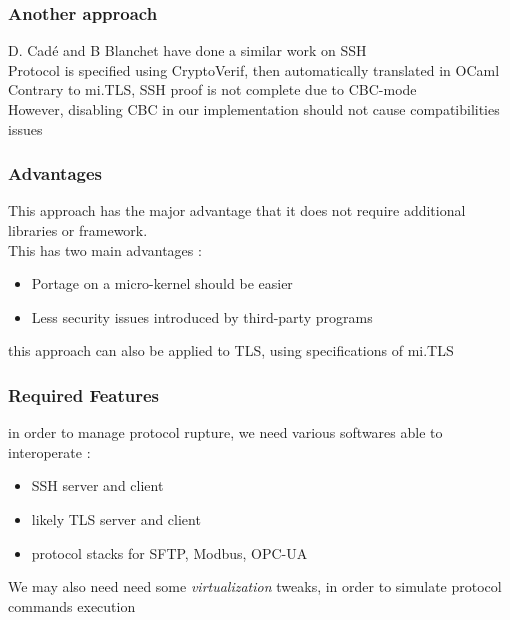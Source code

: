 \documentclass{beamer}
\begin{document}
\begin{frame}
\frametitle{Another approach}

D. Cad\'e and B Blanchet have done a similar work on SSH\\

Protocol is specified using CryptoVerif, then automatically translated in OCaml\\

Contrary to mi.TLS, SSH proof is not complete due to CBC-mode\\
However, disabling CBC in our implementation should not cause compatibilities issues

\end{frame}


\begin{frame}
  \frametitle{Advantages}
  This approach has the major advantage that it does not require additional libraries or framework.\\
  This has two main advantages :
  \begin{itemize}
  \item Portage on a micro-kernel should be easier
  \item Less security issues introduced by third-party programs
  \end{itemize}

  this approach can also be applied to TLS, using specifications of mi.TLS

\end{frame}



\begin{frame}
\frametitle{Required Features}
in order to manage protocol rupture, we need various softwares able to interoperate :
\begin{itemize}
  \item SSH server and client
  \item likely TLS server and client
  \item protocol stacks for SFTP, Modbus, OPC-UA
\end{itemize}

We may also need need some \emph{virtualization} tweaks, in order to simulate protocol commands execution

\end{frame}
\end{document}
